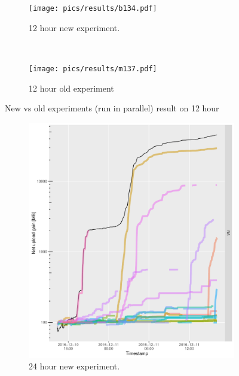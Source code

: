 \begin{figure}[t!]
		\begin{adjustwidth}{-2.5cm}{}
	\begin{subfigure}[t]{0.7\textwidth}
		\centering
		\texttt{[image: pics/results/b134.pdf]}
		\caption{12 hour new experiment.}
	\end{subfigure}
	~
	\begin{subfigure}[t]{0.7\textwidth}
		\centering
		\texttt{[image: pics/results/m137.pdf]}
		\caption{12 hour old experiment}
	\end{subfigure}
	\caption{New vs old experiments (run in parallel) result on 12 hour}
		\end{adjustwidth}
\end{figure}

\begin{figure}[t!]
	\begin{adjustwidth}{-2.5cm}{}
		\begin{subfigure}[t]{0.7\textwidth}
			\centering
			\includegraphics[width=\textwidth]{pics/results/b136.pdf}
			\caption{24 hour new experiment.}
		\end{subfigure}
		~
		\begin{subfigure}[t]{0.7\textwidth}

\end{subfigure}
\end{adjustwidth}
\end{figure}

